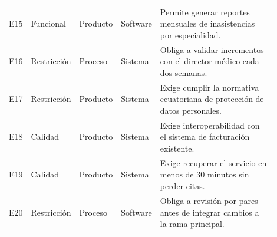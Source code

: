 \documentclass[11pt,a4paper]{article}
\begin{document}
\begin{longtable}{@{}p{0.08\linewidth}p{0.12\linewidth}p{0.12\linewidth}p{0.12\linewidth}p{0.46\linewidth}@{}}
E15 & Funcional & Producto & Software & Permite generar reportes mensuales de inasistencias por especialidad. \\
E16 & Restricción & Proceso & Sistema & Obliga a validar incrementos con el director médico cada dos semanas. \\
E17 & Restricción & Producto & Sistema & Exige cumplir la normativa ecuatoriana de protección de datos personales. \\
E18 & Calidad & Producto & Sistema & Exige interoperabilidad con el sistema de facturación existente. \\
E19 & Calidad & Producto & Sistema & Exige recuperar el servicio en menos de 30 minutos sin perder citas. \\
E20 & Restricción & Proceso & Software & Obliga a revisión por pares antes de integrar cambios a la rama principal. \\
\bottomrule
\end{longtable}
\normalsize
\end{document}
